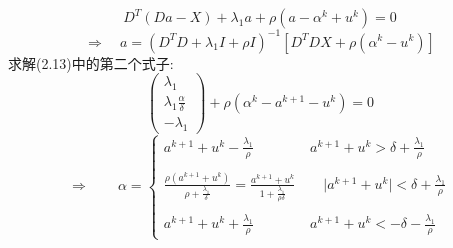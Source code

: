 \documentclass[245.0pt]{article}
\begin{document}
\begin{equation*}
D^{T} ( D a - X ) + \lambda_{1} a + \rho ( a - \alpha^{k} + u^{k} ) = 0 \tag{2.14}
\end{equation*}
\begin{equation*}
\Rightarrow \quad a = ( D^{T} D + \lambda_{1} I + \rho I )^{-1} [ D^{T}DX + \rho ( \alpha^{k} - u^{k} ) ]
\tag{2.15}
\end{equation*}
求解(2.13)中的第二个式子:
\begin{equation*}
\begin{pmatrix}
\lambda_{1}\\
\lambda_{1} \frac{\alpha}{\delta}\\
-\lambda_{1}
\end{pmatrix}
+ \rho(\alpha^k - a^{k+1} - u^{k}) = 0 \tag{2.16}
\end{equation*}
\begin{equation*}
\Rightarrow \qquad \alpha = 
\begin{cases}
a^{k+1}+u^{k}-\frac{\lambda_{1}}{\rho} \qquad \qquad a^{k+1} + u^{k}>\delta + \frac{\lambda_{1}}{\rho} \\
\\
\frac{\rho(a^{k+1}+u^{k})}{\rho + \frac{\lambda_{1}}{\delta}} = \frac{a^{k+1} + u^{k}}{1+\frac{\lambda_{1}}{\rho \delta}} \qquad \vert a^{k+1} + u^{k} \vert < \delta + \frac{\lambda_{1}}{\rho} \\
\\
a^{k+1} + u^{k} + \frac{\lambda_{1}}{\rho} \qquad \qquad a^{k+1} 
+ u^{k} < -\delta - \frac{\lambda_{1}}{\rho}
\end{cases} \tag{2.17}
\end{equation*}
\end{document}
